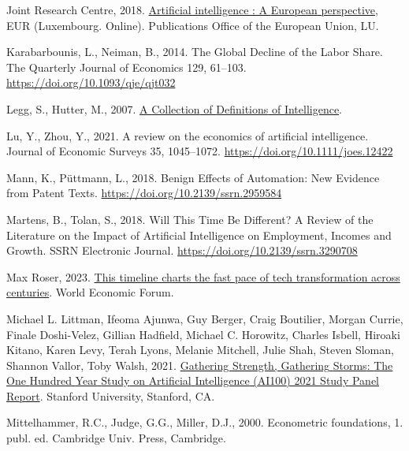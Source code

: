 \documentclass[
  12pt,
  a4paperpaper,
]{article}
\newlength{\cslhangindent}
\newenvironment{CSLReferences}[2] %
 {\begin{list}{}{%
  \setlength{\itemindent}{0pt}
  \setlength{\leftmargin}{0pt}
  \setlength{\parsep}{0pt}
  \ifodd #1
   \setlength{\leftmargin}{\cslhangindent}
   \setlength{\itemindent}{-1\cslhangindent}
  \fi
  \setlength{\itemsep}{#2\baselineskip}}}
 {\end{list}}
\begin{document}
\begin{CSLReferences}{1}{0}
Joint Research Centre, 2018.
\href{https://data.europa.eu/doi/10.2760/11251}{Artificial intelligence
: A {European} perspective}, {EUR} ({Luxembourg}. {Online}).
Publications Office of the European Union, LU.

Karabarbounis, L., Neiman, B., 2014. The {Global} {Decline} of the
{Labor} {Share}. The Quarterly Journal of Economics 129, 61--103.
\url{https://doi.org/10.1093/qje/qjt032}

Legg, S., Hutter, M., 2007. \href{http://arxiv.org/abs/0706.3639}{A
{Collection} of {Definitions} of {Intelligence}}.

Lu, Y., Zhou, Y., 2021. A review on the economics of artificial
intelligence. Journal of Economic Surveys 35, 1045--1072.
\url{https://doi.org/10.1111/joes.12422}

Mann, K., Püttmann, L., 2018. Benign {Effects} of {Automation}: {New}
{Evidence} from {Patent} {Texts}.
\url{https://doi.org/10.2139/ssrn.2959584}

Martens, B., Tolan, S., 2018. Will {This} {Time} {Be} {Different}? {A}
{Review} of the {Literature} on the {Impact} of {Artificial}
{Intelligence} on {Employment}, {Incomes} and {Growth}. SSRN Electronic
Journal. \url{https://doi.org/10.2139/ssrn.3290708}

Max Roser, 2023.
\href{https://www.weforum.org/agenda/2023/02/this-timeline-charts-the-fast-pace-of-tech-transformation-across-centuries/}{This
timeline charts the fast pace of tech transformation across centuries}.
World Economic Forum.

Michael L. Littman, Ifeoma Ajunwa, Guy Berger, Craig Boutilier, Morgan
Currie, Finale Doshi-Velez, Gillian Hadfield, Michael C. Horowitz,
Charles Isbell, Hiroaki Kitano, Karen Levy, Terah Lyons, Melanie
Mitchell, Julie Shah, Steven Sloman, Shannon Vallor, Toby Walsh, 2021.
\href{http://ai100.stanford.edu/2021-report}{Gathering {Strength},
{Gathering} {Storms}: {The} {One} {Hundred} {Year} {Study} on
{Artificial} {Intelligence} ({AI100}) 2021 {Study} {Panel} {Report}}.
Stanford University, Stanford, CA.

Mittelhammer, R.C., Judge, G.G., Miller, D.J., 2000. Econometric
foundations, 1. publ. ed. Cambridge Univ. Press, Cambridge.


\end{CSLReferences}
\end{document}
